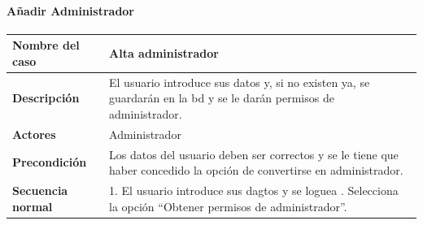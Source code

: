 \paragraph{Añadir Administrador}
\begin{table}[H]
    \centering
    \small
    \begin{tabularx}{0.8\textwidth}{|p{3.5cm}|X|}
        \hline
        \rowcolor{lightgray}
        \textbf{Nombre del caso}  & \textbf{Alta administrador}                                                                                                                                                                                                                                                                                                                         \\
        \hline
        \textbf{Descripción}      & El usuario introduce sus datos y, si no existen ya, se guardarán en la \gls{bd} y se le darán permisos de administrador.                                                                                                                                                                                                                            \\
        \hline
        \textbf{Actores}          & Administrador                                                                                                                                                                                                                                                                                                                                       \\
        \hline
        \textbf{Precondición}     & Los datos del usuario deben ser correctos y se le tiene que haber concedido la opción de convertirse en administrador.                                                                                                                                                                                                                              \\
        \hline
        \textbf{Secuencia normal} & 1. El usuario introduce sus dagtos y se loguea \newline
        2. Selecciona la opción ``Obtener permisos de administrador''.                                                                                                                                                                                                                                                                                                                  \\

\end{tabularx}
\end{table}
